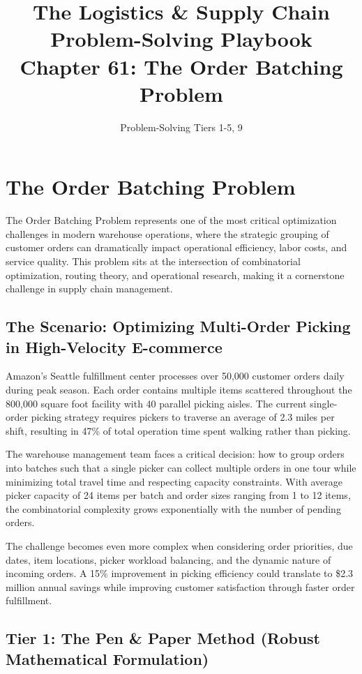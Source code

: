 \documentclass{article}
\title{The Logistics \& Supply Chain Problem-Solving Playbook\\
Chapter 61: The Order Batching Problem}
\author{Problem-Solving Tiers 1-5, 9}
\date{}
\begin{document}
\maketitle

\section{The Order Batching Problem}

The Order Batching Problem represents one of the most critical optimization challenges in modern warehouse operations, where the strategic grouping of customer orders can dramatically impact operational efficiency, labor costs, and service quality. This problem sits at the intersection of combinatorial optimization, routing theory, and operational research, making it a cornerstone challenge in supply chain management.

\subsection{The Scenario: Optimizing Multi-Order Picking in High-Velocity E-commerce}

Amazon's Seattle fulfillment center processes over 50,000 customer orders daily during peak season. Each order contains multiple items scattered throughout the 800,000 square foot facility with 40 parallel picking aisles. The current single-order picking strategy requires pickers to traverse an average of 2.3 miles per shift, resulting in 47\% of total operation time spent walking rather than picking.

The warehouse management team faces a critical decision: how to group orders into batches such that a single picker can collect multiple orders in one tour while minimizing total travel time and respecting capacity constraints. With average picker capacity of 24 items per batch and order sizes ranging from 1 to 12 items, the combinatorial complexity grows exponentially with the number of pending orders.

The challenge becomes even more complex when considering order priorities, due dates, item locations, picker workload balancing, and the dynamic nature of incoming orders. A 15\% improvement in picking efficiency could translate to \$2.3 million annual savings while improving customer satisfaction through faster order fulfillment.

\subsection{Tier 1: The Pen \& Paper Method (Robust Mathematical Formulation)}
\end{document}
